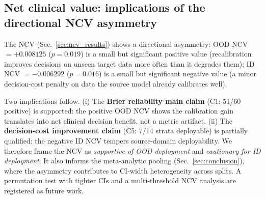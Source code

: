 \documentclass[review,12pt,nonatbib]{elsarticle}
\begin{document}
\subsection{Net clinical value: implications of the directional NCV asymmetry}
\label{sec:ncv_discussion}
The NCV (Sec.~\ref{sec:ncv_results}) shows a directional asymmetry: OOD
NCV $= +0.008125$ ($p = 0.019$) is a small but significant positive value
(recalibration improves decisions on unseen target data more often than it
degrades them); ID NCV $= -0.006292$ ($p = 0.016$) is a small but
significant negative value (a minor decision-cost penalty on data the
source model already calibrates well).

Two implications follow. (i) The \textbf{Brier reliability main claim}
(C1: 51/60 positive) is supported: the positive OOD NCV shows the
calibration gain translates into net clinical decision benefit, not a
metric artifact. (ii) The \textbf{decision-cost
improvement claim} (C5: 7/14 strata deployable) is partially qualified:
the negative ID NCV tempers source-domain deployability. We therefore
frame the NCV as \emph{supportive of OOD deployment} and \emph{cautionary
for ID deployment}. It also informs the meta-analytic pooling
(Sec.~\ref{sec:conclusion}), where the asymmetry contributes to CI-width
heterogeneity across splits. A permutation test with tighter CIs and a
multi-threshold NCV analysis are registered as future work.

\end{document}
